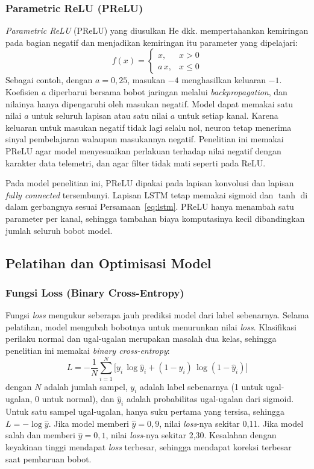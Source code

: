 \subsubsection{Parametric ReLU (PReLU)}
\textit{Parametric ReLU} (PReLU) yang diusulkan He dkk. mempertahankan kemiringan pada bagian negatif dan menjadikan kemiringan itu parameter yang dipelajari:
\begin{equation}
  f(x) =
  \begin{cases}
    x, & x > 0 \\
    a\,x, & x \le 0
  \end{cases}
  \label{eq:prelu}
\end{equation}
Sebagai contoh, dengan $a = 0{,}25$, masukan $-4$ menghasilkan keluaran $-1$. Koefisien $a$ diperbarui bersama bobot jaringan melalui \textit{backpropagation}, dan nilainya hanya dipengaruhi oleh masukan negatif. Model dapat memakai satu nilai $a$ untuk seluruh lapisan atau satu nilai $a$ untuk setiap kanal. Karena keluaran untuk masukan negatif tidak lagi selalu nol, neuron tetap menerima sinyal pembelajaran walaupun masukannya negatif. Penelitian ini memakai PReLU agar model menyesuaikan perlakuan terhadap nilai negatif dengan karakter data telemetri, dan agar filter tidak mati seperti pada ReLU.

Pada model penelitian ini, PReLU dipakai pada lapisan konvolusi dan lapisan \textit{fully connected} tersembunyi. Lapisan LSTM tetap memakai sigmoid dan $\tanh$ di dalam gerbangnya sesuai Persamaan~\ref{eq:lstm}. PReLU hanya menambah satu parameter per kanal, sehingga tambahan biaya komputasinya kecil dibandingkan jumlah seluruh bobot model.


\subsection{Pelatihan dan Optimisasi Model}
\subsubsection{Fungsi Loss (Binary Cross-Entropy)}
Fungsi \textit{loss} mengukur seberapa jauh prediksi model dari label sebenarnya. Selama pelatihan, model mengubah bobotnya untuk menurunkan nilai \textit{loss}. Klasifikasi perilaku normal dan ugal-ugalan merupakan masalah dua kelas, sehingga penelitian ini memakai \textit{binary cross-entropy}:
\begin{equation}
  L = -\frac{1}{N} \sum_{i=1}^{N} \Big[ y_{i}\,\log \hat{y}_{i} + (1 - y_{i})\,\log (1 - \hat{y}_{i}) \Big]
  \label{eq:bce}
\end{equation}
dengan $N$ adalah jumlah sampel, $y_{i}$ adalah label sebenarnya (1 untuk ugal-ugalan, 0 untuk normal), dan $\hat{y}_{i}$ adalah probabilitas ugal-ugalan dari sigmoid. Untuk satu sampel ugal-ugalan, hanya suku pertama yang tersisa, sehingga $L = -\log \hat{y}$. Jika model memberi $\hat{y} = 0{,}9$, nilai \textit{loss}-nya sekitar 0,11. Jika model salah dan memberi $\hat{y} = 0{,}1$, nilai \textit{loss}-nya sekitar 2,30. Kesalahan dengan keyakinan tinggi mendapat \textit{loss} terbesar, sehingga mendapat koreksi terbesar saat pembaruan bobot.

